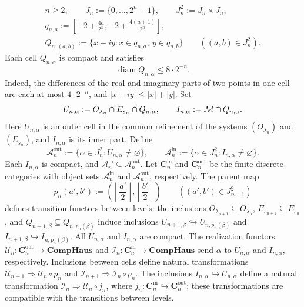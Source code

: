 \begin{equation}
 \label{eq:dyadic-grid-cells}
 \begin{gathered}
 n\ge2,\qquad J_n:=\{0,\ldots,2^n-1\},\qquad J_n^2:=J_n\times J_n,\\
 q_{n,a}:=
 \left[-2+\frac{4a}{2^n},-2+\frac{4(a+1)}{2^n}\right],\\
 Q_{n,(a,b)}:=
 \{x+iy:x\in q_{n,a},\ y\in q_{n,b}\}
 \qquad((a,b)\in J_n^2).
 \end{gathered}
\end{equation}
Each cell \(Q_{n,\alpha}\) is compact and satisfies
\begin{equation}
 \operatorname{diam}Q_{n,\alpha}\le8\cdot2^{-n}.
 \label{eq:dyadic-grid-diameter}
\end{equation}
Indeed, the differences of the real and imaginary parts of two points
in one cell are each at most \(4\cdot2^{-n}\), and
\(|x+iy|\le|x|+|y|\). Set
\[
 U_{n,\alpha}:=O_{\lambda_n}\cap E_{s_n}\cap Q_{n,\alpha},
 \qquad
 I_{n,\alpha}:=\mathcal M\cap Q_{n,\alpha}.
\]
Here \(U_{n,\alpha}\) is an outer cell in the common refinement of the
systems \((O_{\lambda_n})\) and \((E_{s_n})\), and \(I_{n,\alpha}\) is
its inner part. Define
\[
 \mathcal A_n^{\mathrm{out}}:=
   \{\alpha\in J_n^2:U_{n,\alpha}\ne\varnothing\},
 \qquad
 \mathcal A_n^{\mathrm{in}}:=
   \{\alpha\in J_n^2:I_{n,\alpha}\ne\varnothing\}.
\]
Each \(I_{n,\alpha}\) is compact, and
\(\mathcal A_n^{\mathrm{in}}\subseteq\mathcal A_n^{\mathrm{out}}\).
Let \(\mathbf C_n^{\mathrm{in}}\) and
\(\mathbf C_n^{\mathrm{out}}\) be the finite discrete categories with
object sets \(\mathcal A_n^{\mathrm{in}}\) and
\(\mathcal A_n^{\mathrm{out}}\), respectively. The parent map
\[
 p_n(a',b'):=\left(\left\lfloor\frac{a'}2\right\rfloor,
                       \left\lfloor\frac{b'}2\right\rfloor\right)
 \qquad((a',b')\in J_{n+1}^2)
\]
defines transition functors between levels: the inclusions
\(O_{\lambda_{n+1}}\subseteq O_{\lambda_n}\),
\(E_{s_{n+1}}\subseteq E_{s_n}\), and
\(Q_{n+1,\beta}\subseteq Q_{n,p_n(\beta)}\) induce inclusions
\(U_{n+1,\beta}\hookrightarrow U_{n,p_n(\beta)}\) and
\(I_{n+1,\beta}\hookrightarrow I_{n,p_n(\beta)}\).
All \(U_{n,\alpha}\) and \(I_{n,\alpha}\) are compact. The realization
functors \(\mathcal U_n:\mathbf C_n^{\mathrm{out}}\to\mathbf{CompHaus}\)
and \(\mathcal I_n:\mathbf C_n^{\mathrm{in}}\to\mathbf{CompHaus}\)
send \(\alpha\) to \(U_{n,\alpha}\) and \(I_{n,\alpha}\),
respectively. Inclusions between cells define natural transformations
\(\mathcal U_{n+1}\Rightarrow\mathcal U_n\circ p_n\) and
\(\mathcal I_{n+1}\Rightarrow\mathcal I_n\circ p_n\). The inclusions
\(I_{n,\alpha}\hookrightarrow U_{n,\alpha}\) define a natural
transformation \(\mathcal I_n\Rightarrow\mathcal U_n\circ j_n\), where
\(j_n:\mathbf C_n^{\mathrm{in}}\hookrightarrow\mathbf C_n^{\mathrm{out}}\);
these transformations are compatible with the transitions between
levels.

